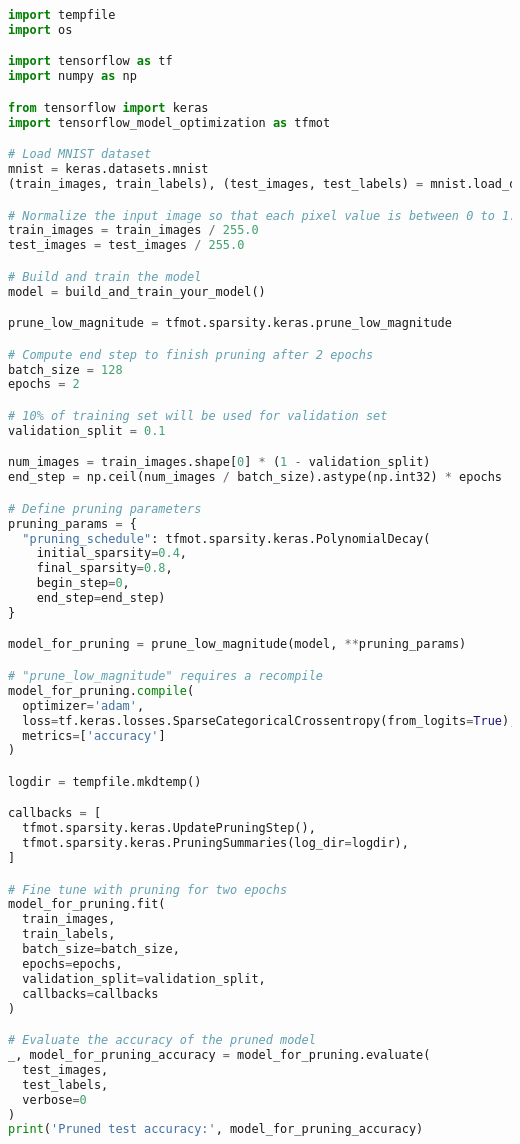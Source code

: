 \begin{lstlisting}[language=Python, label={lst:tfmotpruningexample},
    caption=Pruning example in TFMOT]
import tempfile
import os

import tensorflow as tf
import numpy as np

from tensorflow import keras
import tensorflow_model_optimization as tfmot

# Load MNIST dataset
mnist = keras.datasets.mnist
(train_images, train_labels), (test_images, test_labels) = mnist.load_data()

# Normalize the input image so that each pixel value is between 0 to 1.
train_images = train_images / 255.0
test_images = test_images / 255.0

# Build and train the model
model = build_and_train_your_model()

prune_low_magnitude = tfmot.sparsity.keras.prune_low_magnitude

# Compute end step to finish pruning after 2 epochs
batch_size = 128
epochs = 2

# 10% of training set will be used for validation set
validation_split = 0.1

num_images = train_images.shape[0] * (1 - validation_split)
end_step = np.ceil(num_images / batch_size).astype(np.int32) * epochs

# Define pruning parameters
pruning_params = {
  "pruning_schedule": tfmot.sparsity.keras.PolynomialDecay(
    initial_sparsity=0.4,
    final_sparsity=0.8,
    begin_step=0,
    end_step=end_step)
}

model_for_pruning = prune_low_magnitude(model, **pruning_params)

# "prune_low_magnitude" requires a recompile
model_for_pruning.compile(
  optimizer='adam',
  loss=tf.keras.losses.SparseCategoricalCrossentropy(from_logits=True),
  metrics=['accuracy']
)

logdir = tempfile.mkdtemp()

callbacks = [
  tfmot.sparsity.keras.UpdatePruningStep(),
  tfmot.sparsity.keras.PruningSummaries(log_dir=logdir),
]

# Fine tune with pruning for two epochs
model_for_pruning.fit(
  train_images,
  train_labels,
  batch_size=batch_size,
  epochs=epochs,
  validation_split=validation_split,
  callbacks=callbacks
)

# Evaluate the accuracy of the pruned model
_, model_for_pruning_accuracy = model_for_pruning.evaluate(
  test_images,
  test_labels,
  verbose=0
)
print('Pruned test accuracy:', model_for_pruning_accuracy)
\end{lstlisting}

